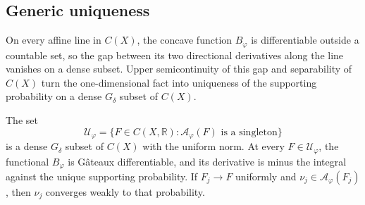 \subsection{Generic uniqueness}
\label{sec:generic-adjoints}

On every affine line in $C(X)$, the concave function $B_\varphi$ is differentiable outside a countable set, so the gap between its two directional derivatives along the line vanishes on a dense subset. Upper semicontinuity of this gap and separability of $C(X)$ turn the one-dimensional fact into uniqueness of the supporting probability on a dense $G_\delta$ subset of $C(X)$.

\begin{theorem}\label{thm:generic-adjoint-uniqueness}\label{cor:generic-adjoint-approximation}
The set
\[
 \mathscr U_\varphi
   =\{F\in C(X,\mathbb R):\mathcal A_\varphi(F)
                                  \text{ is a singleton}\}
\]
is a dense $G_\delta$ subset of $C(X)$ with the uniform norm. At every $F\in\mathscr U_\varphi$, the functional $B_\varphi$ is G\^ateaux differentiable, and its derivative is minus the integral against the unique supporting probability. If $F_j\to F$ uniformly and $\nu_j\in\mathcal A_\varphi(F_j)$, then $\nu_j$ converges weakly to that probability.
\end{theorem}
